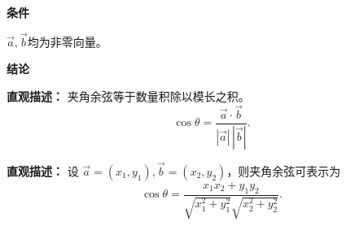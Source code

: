 \begin{statementbox}
	\textbf{\textcolor{CStatement}{条件}}
	\begin{description}[style=nextline, leftmargin=2.8em, labelsep=0.5em, itemsep=0.35em]
		\item[\textbf{\textcolor{CStatement}{条件1（向量非零）：}}] $\vec{a},\vec{b}$均为非零向量。
	\end{description}

	\textbf{\textcolor{CStatement}{结论}}
	\begin{description}[style=nextline, leftmargin=2.8em, labelsep=0.5em, itemsep=0.45em]
		\item[\textbf{\textcolor{CStatement}{结论一（公式定义）：}}]
			\textbf{\textcolor{CStatement}{直观描述：}}
			夹角余弦等于数量积除以模长之积。
			\[
				\cos\theta = \frac{\vec{a}\cdot\vec{b}}{|\vec{a}|\,|\vec{b}|}.
			\]

		\item[\textbf{\textcolor{CStatement}{常见变形（坐标运算）：}}]
			\textbf{\textcolor{CStatement}{直观描述：}}
			设 $\vec{a}=(x_1,y_1),\vec{b}=(x_2,y_2)$，则夹角余弦可表示为
			\[
				\cos\theta = \frac{x_1x_2+y_1y_2}{\sqrt{x_1^2+y_1^2}\sqrt{x_2^2+y_2^2}}.
			\]
	\end{description}
\end{statementbox}
